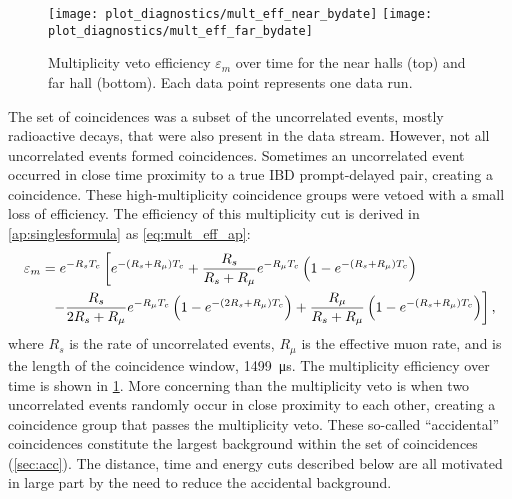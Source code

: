 \begin{figure}
    \centering
    \texttt{[image: plot\_diagnostics/mult\_eff\_near\_bydate]}
    \texttt{[image: plot\_diagnostics/mult\_eff\_far\_bydate]}
    \caption[Multiplicity veto efficiency over time]{
        Multiplicity veto efficiency $\varepsilon_m$ over time for
        the near halls (top) and far hall (bottom).
        Each data point represents one data run.
    }
    \label{fig:mult_eff}
\end{figure}
The set of  coincidences was a subset
of the uncorrelated events, mostly radioactive decays,
that were also present in the data stream.
However, not all uncorrelated events formed  coincidences.
Sometimes an uncorrelated event occurred in close time proximity to
a true IBD prompt-delayed pair, creating a  coincidence.
These high-multiplicity coincidence groups were vetoed
with a small loss of efficiency.
The efficiency of this multiplicity cut is derived in \cref{ap:singlesformula} as
\cref{eq:mult_eff_ap}:
\begin{align}
    \label{eq:mult_eff}
    \begin{split}
        \varepsilon_m &= e^{-R_s T_c}
        \left[
            e^{-(R_s + R_\mu)T_c} +
            \frac{R_s}{R_s+R_\mu} e^{-R_\mu T_c}
            \left(
                1 - e^{-(R_s + R_\mu)T_c}
            \right)
        \right. \\
              &\ \ \left. - \frac{R_s}{2R_s + R_\mu} e^{-R_\mu T_c}
                  \left(
                      1 - e^{-(2R_s + R_\mu)T_c}
                  \right) +
                  \frac{R_\mu}{R_s + R_\mu}
                  \left(
                      1 - e^{-(R_s + R_\mu)T_c}
                  \right)
              \right],
    \end{split}
\end{align}
where $R_s$ is the rate of uncorrelated events,
$R_\mu$ is the effective muon rate,
and \tc{} is the length of the coincidence window, \SI{1499}{\us}.
The multiplicity efficiency over time is shown in \cref{fig:mult_eff}.
More concerning than the multiplicity veto is when two uncorrelated events
randomly occur in close proximity to each other,
creating a  coincidence group that passes the multiplicity veto.
These so-called ``accidental'' coincidences
constitute the largest background within the set of  coincidences
(\cref{sec:acc}).
The distance, time and energy cuts described below
are all motivated in large part by the need to reduce the accidental background.


